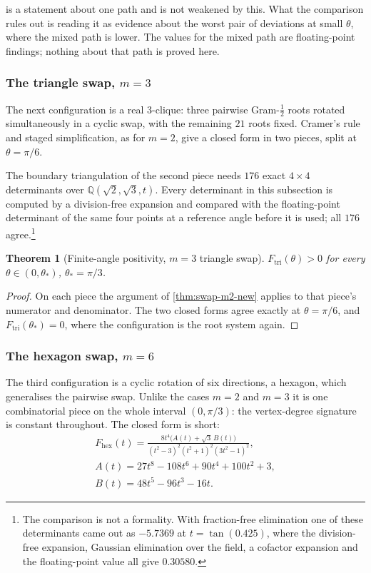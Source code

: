 \documentclass[11pt,reqno]{amsart}
\renewcommand{\_}{\origunderscore\allowbreak}
\numberwithin{equation}{section}
\theoremstyle{plain}
\newtheorem{thm}{Theorem}[section]
\theoremstyle{definition}
\theoremstyle{remark}
\begin{document}
 is a statement about one path and is not
weakened by this. What the comparison rules out is reading it as
evidence about the worst pair of deviations at small $\theta$, where
the mixed path is lower. The values for the mixed path are
floating-point findings; nothing about that path is proved here.

\subsubsection{The triangle swap, \texorpdfstring{$m=3$}{m=3}}\label{sec:swap-m3}

The next configuration is a real $3$-clique: three pairwise
Gram-$\tfrac12$ roots rotated simultaneously in a cyclic swap, with the
remaining $21$ roots fixed. Cramer's rule and staged simplification, as
for $m=2$, give a closed form in two pieces, split at $\theta=\pi/6$.

The boundary triangulation of the second piece needs $176$ exact
$4\times4$ determinants over $\mathbb{Q}(\sqrt2,\sqrt3,t)$. Every
determinant in this subsection is computed by a division-free expansion
and compared with the floating-point determinant of the same four points
at a reference angle before it is used; all $176$ agree.\footnote{The
comparison is not a formality. With fraction-free elimination one of
these determinants came out as $-5.7369$ at $t=\tan(0.425)$, where the
division-free expansion, Gaussian elimination over the field, a cofactor
expansion and the floating-point value all give $0.30580$.}

\begin{thm}[Finite-angle positivity, $m=3$ triangle swap]\label{thm:swap-m3-new}
$F_{\mathrm{tri}}(\theta)>0$ for every $\theta\in(0,\theta_*)$,
$\theta_*=\pi/3$.
\end{thm}

\begin{proof}
On each piece the argument of \cref{thm:swap-m2-new} applies to that
piece's numerator and denominator. The two closed forms agree exactly at
$\theta=\pi/6$, and $F_{\mathrm{tri}}(\theta_*)=0$, where the
configuration is the root system again.
\end{proof}

\subsubsection{The hexagon swap, \texorpdfstring{$m=6$}{m=6}}\label{sec:swap-m6}

The third configuration is a cyclic rotation of six directions, a
hexagon, which generalises the pairwise swap. Unlike the cases $m=2$ and
$m=3$ it is one combinatorial piece on the whole interval $(0,\pi/3)$:
the vertex-degree signature is constant throughout. The closed form is
short:
\[
\begin{gathered}
  F_{\mathrm{hex}}(t) = \frac{8t^4\bigl(A(t)+\sqrt3\,B(t)\bigr)}
  {(t^2-3)^2(t^2+1)^2(3t^2-1)^2},\\
  A(t)=27t^8-108t^6+90t^4+100t^2+3,\\
  B(t)=48t^5-96t^3-16t.
\end{gathered}
\]
\end{document}
